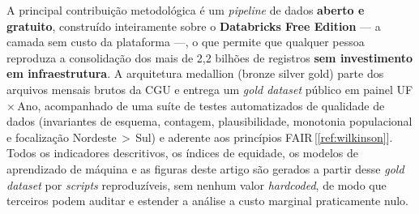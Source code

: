 \documentclass[12pt,a4paper,oneside]{article}
\begin{document}
A principal contribuição metodológica é um \textit{pipeline} de dados
\textbf{aberto e gratuito}, construído inteiramente sobre o
\textbf{Databricks Free Edition} --- a camada sem custo da plataforma ---,
o que permite que qualquer pessoa reproduza a consolidação dos mais de
2,2 bilhões de registros \textbf{sem investimento em infraestrutura}.
A arquitetura medallion (bronze \textrightarrow{} silver
\textrightarrow{} gold) parte dos arquivos mensais brutos da CGU e
entrega um \textit{gold dataset} público em painel UF\,$\times$\,Ano,
acompanhado de uma suíte de testes automatizados de qualidade de dados
(invariantes de esquema, contagem, plausibilidade, monotonia
populacional e focalização Nordeste\,$>$\,Sul) e aderente aos
princípios FAIR\,[\ref{ref:wilkinson}]. Todos os indicadores
descritivos, os índices de equidade, os modelos de aprendizado de
máquina e as figuras deste artigo são gerados a partir desse
\textit{gold dataset} por \textit{scripts} reproduzíveis, sem nenhum
valor \textit{hardcoded}, de modo que terceiros podem auditar e
estender a análise a custo marginal praticamente nulo.

\end{document}

